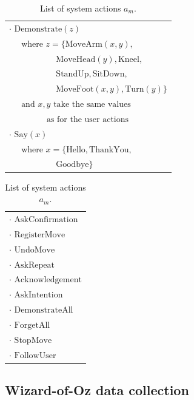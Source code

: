 \begin{table}[h]
\begin{footnotesize}
\begin{tabular}{p{60mm}} 
$\cdot$ $\mathrm{Demonstrate}(z)$ \\ $\ \ \ \ \ \text { where } z = \{\mathrm{MoveArm}(x,y), $ \\ $\ \ \ \ \ \ \ \ \ \ \ \ \ \ \ \ \ \ \ \ \ \ \ \ \  \mathrm{MoveHead}(y),\mathrm{Kneel}, $ \\ $\ \ \ \ \ \ \ \ \ \ \ \ \ \ \ \ \ \ \ \ \ \ \ \ \  \mathrm{StandUp},\mathrm{SitDown}, $ \\ $\ \ \ \ \ \ \ \ \ \ \ \ \ \ \ \ \ \ \ \ \ \ \ \ \  \mathrm{MoveFoot}(x,y), \mathrm{Turn}(y)\}$ \\ $\ \ \ \ \ \text{ and } x, y \text{ take the same values}$ \\ $\ \ \ \ \ \ \ \ \ \ \ \ \ \ \ \ \ \ \ \ \text{as for the user actions}$ \\
$\cdot$ $\mathrm{Say}(x)$ \\  $ \ \ \ \ \  \text{ where } x = \{\mathrm{Hello, ThankYou,}$ \\ $\ \ \ \ \ \ \ \ \ \ \ \ \ \ \ \ \ \ \ \ \ \ \ \ \  \mathrm{Goodbye}\}$
\end{tabular}
\hspace{2cm}
\begin{tabular}{p{60mm}} 
$\cdot$ $\mathrm{AskConfirmation}$ \\
$\cdot$ $\mathrm{RegisterMove}$ \\
$\cdot$ $\mathrm{UndoMove}$ \\
$\cdot$ $\mathrm{AskRepeat}$ \\
$\cdot$ $\mathrm{Acknowledgement}$ \\
$\cdot$ $\mathrm{AskIntention}$ \\
$\cdot$ $\mathrm{DemonstrateAll}$ \\
$\cdot$ $\mathrm{ForgetAll}$ \\
$\cdot$ $\mathrm{StopMove}$ \\
$\cdot$ $\mathrm{FollowUser}$ 

\end{tabular}
\end{footnotesize}
\caption{List of system actions $a_m$.} 
\label{table:systemdas}
\end{table}

\subsection{Wizard-of-Oz data collection}
\label{sec:wozlearning-experiments-woz}

